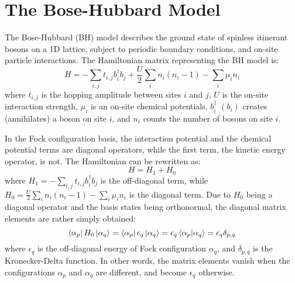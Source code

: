 \documentclass[12pt, two sided]{article}
\begin{document}
\section{The Bose-Hubbard Model}

The Bose-Hubbard (BH) model describes the ground state of spinless itinerant bosons on a 1D lattice, subject to periodic boundary conditions, and on-site particle interactions. The Hamiltonian matrix representing the BH model is:
%
\begin{equation}
\label{eq:bh_hamiltonian}
H = - \sum_{ i,j } t_{i,j} b_i^{\dag} b_j + \frac{U}{2} \sum_i n_i (n_i-1) - \sum_i \mu_i n_i
\end{equation}
%
where $t_{i,j}$ is the hopping amplitude between sites $i$ and $j$, $U$ is the on-site interaction strength, $\mu_i$ is an on-site chemical potentials,  $b_i^{\dag}$ $(b_i)$ creates (annihilates) a boson on site $i$, and $n_i$ counts the number of bosons on site $i$. 

In the Fock configuration basis, the interaction potential and the chemical potential terms are diagonal operators, while the first term, the kinetic energy operator, is not. The Hamiltonian can be rewritten as:
%
\begin{equation}
H = H_1 + H_0
\end{equation}
%
where $H_1 = - \sum_{i,j} t_{i,j} b_i^{\dag} b_j$ is the off-diagonal term, while $H_0 = \frac{U}{2} \sum_i n_i (n_i-1) - \sum_i \mu_i n_i$ is the diagonal term. Due to $H_0$ being a diagonal operator and the basis states being orthonormal, the diagonal matrix elements are rather simply obtained:
%
\begin{equation}
\label{eq:diagonal_elements}
\bra{\alpha_p} H_0 \ket{\alpha_q} =  \bra{\alpha_p}  \epsilon_q \ket{\alpha_q}  = \epsilon_q \bra{\alpha_p} \ket{\alpha_q} = \epsilon_{q} \delta_{p,q}
\end{equation}
%
where $\epsilon_q$ is the off-diagonal energy of Fock configuration $\alpha_q$, and $\delta_{p,q}$ is the Kronecker-Delta function. In other words, the matrix elements vanish when the configurations $\alpha_p$ and $\alpha_q$ are different, and become $\epsilon_q$ otherwise.
\end{document}

